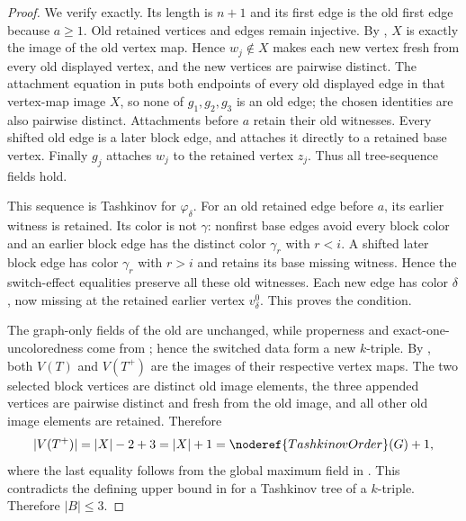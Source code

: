 \begin{proof}
We verify  exactly.  Its length is $n+1$ and its
first edge is the old first edge because $a\ge1$.  Old retained vertices
and edges remain injective.  By , $X$ is
exactly the image of the old vertex map.  Hence $w_j\notin X$ makes each
new vertex fresh from every old displayed vertex, and the new vertices
are pairwise distinct.  The attachment equation in
 puts both endpoints of every old displayed edge
in that vertex-map image $X$, so none of $g_1,g_2,g_3$ is an old edge;
the chosen identities are also pairwise distinct.  Attachments before
$a$ retain their old witnesses.  Every shifted old edge is a later block
edge, and  attaches it directly
to a retained base vertex.  Finally $g_j$ attaches $w_j$ to the retained
vertex $z_j$.  Thus all tree-sequence fields hold.

This sequence is Tashkinov for $\varphi_\delta$.  For an old retained
edge before $a$, its earlier witness is retained.  Its color is not
$\gamma$: nonfirst base edges avoid every block color and an earlier
block edge has the distinct color $\gamma_r$ with $r<i$.  A shifted
later block edge has color $\gamma_r$ with $r>i$ and retains its base
missing witness.  Hence the switch-effect equalities preserve all these
old witnesses.  Each new edge has color $\delta$, now missing at the
retained earlier vertex $v^0_\delta$.  This proves the
 condition.

The graph-only fields of the old  are unchanged, while
properness and exact-one-uncoloredness come from
; hence the switched data form a
new $k$-triple.  By , both $V(T)$ and
$V(T^+)$ are the images of their respective vertex maps.  The two
selected block vertices are distinct old image elements, the three
appended vertices are pairwise distinct and fresh from the old image,
and all other old image elements are retained.  Therefore
\[
 |V(T^+)|=|X|-2+3=|X|+1=\noderef{TashkinovOrder}(G)+1,
\]
where the last equality follows from the global maximum field in
.  This contradicts the defining upper
bound in  for a Tashkinov tree of a $k$-triple.
Therefore $|B|\le3$.
\end{proof}
